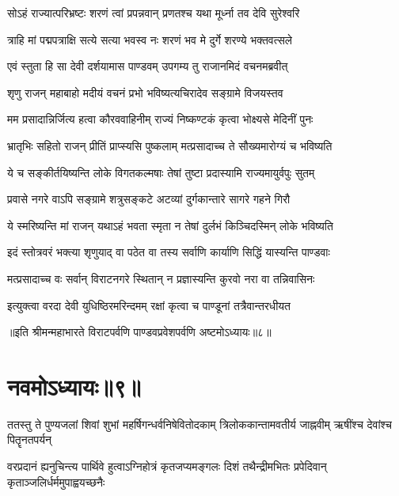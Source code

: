 \twolineshloka
{सोऽहं राज्यात्परिभ्रष्टः शरणं त्वां प्रपन्नवान्}
{प्रणतश्च यथा मूर्ध्ना तव देवि सुरेश्वरि}


\twolineshloka
{त्राहि मां पद्मपत्राक्षि सत्ये सत्या भवस्व नः}
{शरणं भव मे दुर्गे शरण्ये भक्तवत्सले}


\twolineshloka
{एवं स्तुता हि सा देवी दर्शयामास पाण्डवम्}
{उपगम्य तु राजानमिदं वचनमब्रवीत्}



\twolineshloka
{शृणु राजन् महाबाहो मदीयं वचनं प्रभो}
{भविष्यत्यचिरादेव सङ्ग्रामे विजयस्तव}


\twolineshloka
{मम प्रसादान्निर्जित्य हत्वा कौरववाहिनीम्}
{राज्यं निष्कण्टकं कृत्वा भोक्ष्यसे मेदिनीं पुनः}


\twolineshloka
{भ्रातृभिः सहितो राजन् प्रीतिं प्राप्स्यसि पुष्कलाम्}
{मत्प्रसादाच्च ते सौख्यमारोग्यं च भविष्यति}


\twolineshloka
{ये च सङ्कीर्तयिष्यन्ति लोके विगतकल्मषाः}
{तेषां तुष्टा प्रदास्यामि राज्यमायुर्वपुः सुतम्}


\twolineshloka
{प्रवासे नगरे वाऽपि सङ्ग्रामे शत्रुसङ्कटे}
{अटव्यां दुर्गकान्तारे सागरे गहने गिरौ}


\twolineshloka
{ये स्मरिष्यन्ति मां राजन् यथाऽहं भवता स्मृता}
{न तेषां दुर्लभं किञ्चिदस्मिन् लोके भविष्यति}


\twolineshloka
{इदं स्तोत्रवरं भक्त्या शृणुयाद् वा पठेत वा}
{तस्य सर्वाणि कार्याणि सिद्धिं यास्यन्ति पाण्डवाः}


\twolineshloka
{मत्प्रसादाच्च वः सर्वान् विराटनगरे स्थितान्}
{न प्रज्ञास्यन्ति कुरवो नरा वा तन्निवासिनः}


\twolineshloka
{इत्युक्त्वा वरदा देवी युधिष्ठिरमरिन्दमम्}
{रक्षां कृत्वा च पाण्डूनां तत्रैवान्तरधीयत}



॥इति श्रीमन्महाभारते विराटपर्वणि पाण्डवप्रवेशपर्वणि अष्टमोऽध्यायः॥८॥

\chapter{नवमोऽध्यायः॥९॥}

\fourlineindentedshloka
{ततस्तु ते पुण्यजलां शिवां शुभां}
{महर्षिगन्धर्वनिषेवितोदकाम्}
{त्रिलोककान्तामवतीर्य जाह्नवीम्}
{ऋषींश्च देवांश्च पितॄनतपर्यन्}


\fourlineindentedshloka
{वरप्रदानं ह्यनुचिन्त्य पार्थिवे}
{हुत्वाऽग्निहोत्रं कृतजप्यमङ्गलः}
{दिशं तथैन्द्रीमभितः प्रपेदिवान्}
{कृताञ्जलिर्धर्ममुपाह्वयच्छनैः}

